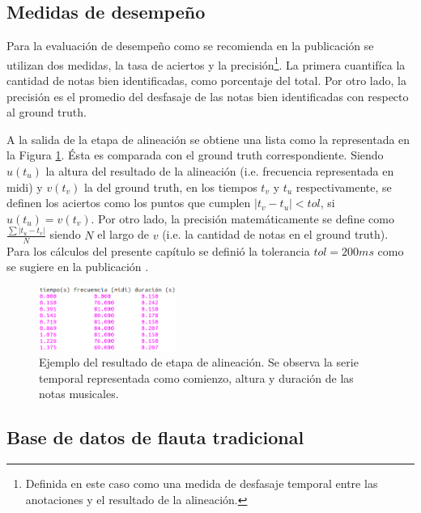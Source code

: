 \documentclass
  [ams,pdfout]%
	{aeslac}
\begin{document}
\subsection{Medidas de desempeño}
\label{sec:medidas_desempeno}

Para la evaluación de desempeño como se recomienda en la publicación \cite{orio2003score} se utilizan dos medidas, la tasa de aciertos y la precisión\footnote{Definida en este caso como una medida de desfasaje temporal entre las anotaciones y el resultado de la alineación.}. La primera cuantifíca la cantidad de notas bien identificadas, como porcentaje del total. Por otro lado, la precisión es el promedio del desfasaje de las notas bien identificadas con respecto al ground truth.

A la salida de la etapa de alineación se obtiene una lista como la representada en la Figura \ref{fig:datos_tabla}. Ésta es comparada con el ground truth correspondiente. Siendo $u(t_u)$ la altura del resultado de la alineación (i.e. frecuencia representada en midi) y $v(t_v)$ la del ground truth, en los tiempos $t_v$ y $t_u$ respectivamente, se definen los aciertos como los puntos que cumplen $|t_v-t_u|<tol$, si $u(t_u)=v(t_v)$. Por otro lado, la precisión matemáticamente se define como $\frac{\sum{|t_u-t_v|}}{N}$ siendo $N$ el largo de $v$ (i.e. la cantidad de notas en el ground truth). Para los cálculos del presente capítulo se definió la tolerancia $tol=200ms$ como se sugiere en la publicación \cite{orio2001alignment}.

\begin{figure}[h!]
\begin{center}
\includegraphics[width=0.4\textwidth]{imagenes/datos} 	
\caption{Ejemplo del resultado de etapa de alineación. Se observa la serie temporal representada como comienzo, altura y duración de las notas musicales.}
\label{fig:datos_tabla}
\end{center}
\end{figure}

\subsection{Base de datos de flauta tradicional}
\end{document}
